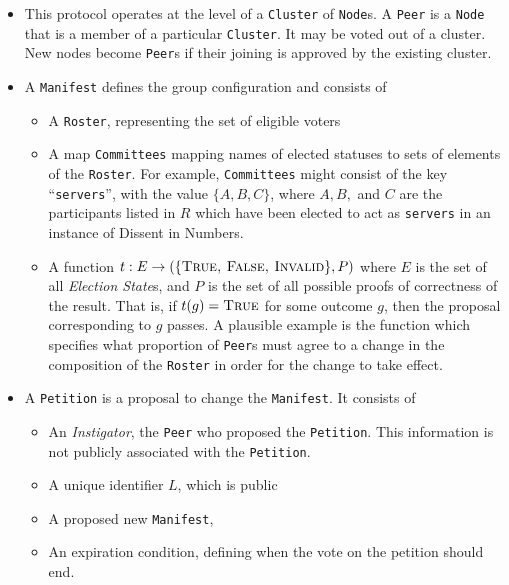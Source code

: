 \begin{itemize}
  \item This protocol operates at the level of a \texttt{Cluster} of
    \texttt{Node}s.  A \texttt{Peer} is a \texttt{Node} that is a member of a
    particular \texttt{Cluster}. It may be voted out of a cluster. New nodes
    become \texttt{Peer}s if their joining is approved by the existing cluster.

  \item A \texttt{Manifest} defines the group configuration and consists of
  \begin{itemize}
    \item A \texttt{Roster}, representing the set of eligible voters
    \item A map \texttt{Committees} mapping names of elected statuses to sets of
      elements of the \texttt{Roster}. For example, \texttt{Committees} might
      consist of the key ``\texttt{servers}'', with the value $\{A, B, C\}$, where
      $A, B,$ and $C$ are the participants listed in $R$ which have been elected
      to act as \texttt{servers} in an instance of Dissent in Numbers.
    \item A function $t : E \to (\{\textsc{True, False, Invalid}\}, P)$
      where $E$ is the set of all \emph{Election State}s, and $P$ is the set
      of all possible proofs of correctness of the result. That is, if $t(g) =
      \textsc{True}$ for some outcome $g$, then the proposal corresponding to
      $g$ passes.
      A plausible example is the function which
      specifies what proportion of \texttt{Peer}s must agree to a change in the
      composition of the \texttt{Roster} in order for the change to take effect.
  \end{itemize}
  \item A \texttt{Petition} is a proposal to change the \texttt{Manifest}. It
    consists of
    \begin{itemize}
      \item An \emph{Instigator}, the \texttt{Peer} who proposed the
        \texttt{Petition}. This information is not publicly associated with
        the \texttt{Petition}.
      \item A unique identifier $L$, which is public
      \item A proposed new \texttt{Manifest},
      \item An expiration condition, defining when the vote on the petition
        should end.
    \end{itemize}

\end{itemize}
